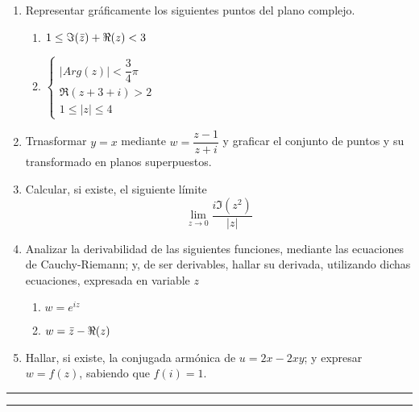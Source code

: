 \documentclass[9pt,a4paper]{extarticle}
\begin{document}
\begin{enumerate}
    \item Representar gráficamente los siguientes puntos del plano complejo.
    \begin{enumerate}
        \item $1 \leq \Im(\Bar{z}) + \Re(z) < 3$
        \item $
     \left\{
	       \begin{array}{c}
		 |Arg(z)| < \dfrac{3}{4} \pi \\
		 \Re(z+3+i)>2\\
		 1 \leq |z| \leq 4
	       \end{array}
	     \right.
$
    \end{enumerate}
    \item Trnasformar $y=x$ mediante $w=\dfrac{z-1}{z+i}$ y graficar el conjunto de puntos y su transformado en planos superpuestos.
    \item Calcular, si existe, el siguiente límite $$ \lim_{z \to 0} \dfrac{i\Im(z^2)}{|z|}$$
    \item Analizar la derivabilidad de las siguientes funciones, mediante las ecuaciones de Cauchy-Riemann; y, de ser derivables, hallar su derivada, utilizando dichas ecuaciones, expresada en variable $z$
    \begin{enumerate}
        \item $w=e^{iz}$
        \item $w=\Bar{z}-\Re(z)$
    \end{enumerate}
    
    \item Hallar, si existe, la conjugada armónica de $u=2x-2xy$; y expresar $w=f(z)$, sabiendo que $f(i) = 1$.
\end{enumerate}
\hrule
\newpage
\hrule
\end{document}

